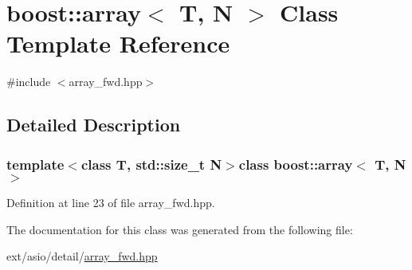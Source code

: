 \hypertarget{classboost_1_1array}{}\section{boost\+:\+:array$<$ T, N $>$ Class Template Reference}
\label{classboost_1_1array}


{\ttfamily \#include $<$array\+\_\+fwd.\+hpp$>$}



\subsection{Detailed Description}
\subsubsection*{template$<$class T, std\+::size\+\_\+t N$>$class boost\+::array$<$ T, N $>$}



Definition at line 23 of file array\+\_\+fwd.\+hpp.



The documentation for this class was generated from the following file\+:\begin{DoxyCompactItemize}
\item 
ext/asio/detail/\hyperlink{array__fwd_8hpp}{array\+\_\+fwd.\+hpp}\end{DoxyCompactItemize}
